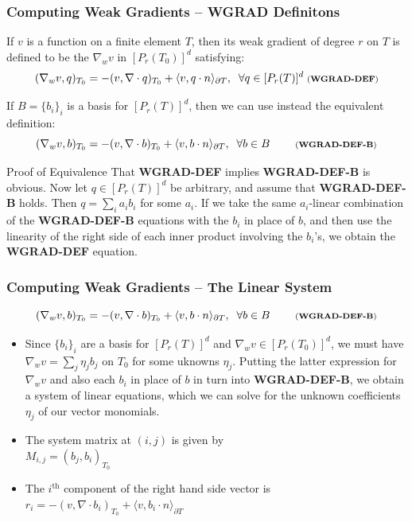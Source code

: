 \documentclass[compress]{beamer}
\begin{document}
\begin{frame}
  \frametitle{Computing Weak Gradients -- WGRAD Definitons}
  If $v$ is a function on a finite element $T$, then its weak gradient of degree $r$ on $T$
  is defined to be the $\nabla_w v$ in $[P_r(T_0)]^d$ satisfying:\\
  \vspace{-0.25cm}
  \begin{equation*}
    (\nabla_w v, q)_{T_0} = -(v, \nabla \cdot q)_{T_0} + \langle v, q \cdot n \rangle_{\partial T}, \;\; \forall q \in [P_r(T)]^d
    \;\text{\scriptsize (\textbf{WGRAD-DEF})}
  \end{equation*}
  \pause
  
  If $B=\{b_i\}_i$ is a basis for $[P_r(T)]^d$, then we can use instead the equivalent definition:
  \begin{equation*}
    (\nabla_w v, b)_{T_0} = -(v, \nabla \cdot b)_{T_0} + \langle v, b \cdot n \rangle_{\partial T}, \;\; \forall b \in B 
    \;\quad\quad \text{\scriptsize (\textbf{WGRAD-DEF-B})}
  \end{equation*}
  \pause
  \begin{block}{Proof of Equivalence}
    \small
    That {\scriptsize \textbf{WGRAD-DEF}} implies {\scriptsize \textbf{WGRAD-DEF-B}} is obvious. Now let $q \in [P_r(T)]^d$ be
    arbitrary, and assume that {\scriptsize \textbf{WGRAD-DEF-B}} holds. Then $q = \sum_i {a_i b_i}$ for some $a_i$. If we take
    the same ${a_i}$-linear combination of the {\scriptsize \textbf{WGRAD-DEF-B}} equations with the $b_i$ in place of $b$,
    and then use the linearity of the right side of each inner product involving the $b_i$'s, we obtain the 
    {\scriptsize \textbf{WGRAD-DEF}} equation.
  \end{block}
\end{frame}

\begin{frame}
  \frametitle{Computing Weak Gradients -- The Linear System}
  \begin{equation*}
    (\nabla_w v, b)_{T_0} = -(v, \nabla \cdot b)_{T_0} + \langle v, b \cdot n \rangle_{\partial T}, \;\; \forall b \in B 
    \;\quad\quad \text{\scriptsize (\textbf{WGRAD-DEF-B})}
  \end{equation*}
  \pause
  \begin{itemize}[<+->]
    \item Since $\{b_i\}_i$ are a basis for $[P_r(T)]^d$ and $\nabla_w v \in [P_r(T_0)]^d$, we must have
      $\nabla_w v = \sum_j {\eta_j b_j}$ on $T_0$ for some uknowns $\eta_j$.
      Putting the latter expression for $\nabla_w v$ and also each $b_i$ in place of $b$ in turn into
      {\scriptsize \textbf{WGRAD-DEF-B}}, we obtain a system of linear equations, which we can solve for
      the unknown coefficients $\eta_j$ of our vector monomials. 
    \item The system matrix at $(i,j)$ is given by\\ $M_{i,j} = (b_j, b_i)_{T_0}$
    \item The $i^{\text{th}}$ component of the right hand side vector is 
      $r_i = -(v, \nabla \cdot b_i)_{T_0} + \langle v, b_i \cdot n \rangle_{\partial T}$
  \end{itemize}
\end{frame}
\end{document}
